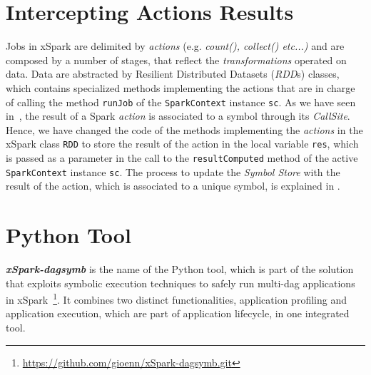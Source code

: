 \section{Intercepting Actions Results}\label{sec:running_jobs}
Jobs in xSpark are delimited by \textit{actions} (e.g. \textit{count(), collect()  etc...)} and are composed by a number of stages, that reflect the \textit{transformations} operated on data. Data are abstracted by Resilient Distributed Datasets (\textit{RDD}s) classes, which contains specialized methods implementing the actions that are in charge of calling the method \texttt{runJob} of  the \texttt{SparkContext} instance \texttt{sc}. 
As we have seen in~, the result of a Spark \textit{action} is associated to a symbol through its \textit{CallSite}. Hence, we have changed the code of the methods implementing the \textit{actions} in the xSpark class \texttt{RDD} to store the result of the action in the local variable \texttt{res}, which is passed as a parameter in the call to the \texttt{resultComputed} method of the active \texttt{SparkContext} instance \texttt{sc}. The process to update the \tool \textit{Symbol Store} with the result of the action, which is associated to a unique symbol, is explained in  .  


\section{Python Tool}\label{sec:xspark_dagsymb}

\textbf{\textit{xSpark-dagsymb}} is the name of the Python tool, which is part of the \tool solution that exploits symbolic execution techniques to safely run multi-dag applications in xSpark~\footnote{\url{https://github.com/gioenn/xSpark-dagsymb.git}}.
It combines two distinct functionalities, application profiling and
application execution, which are part of \tool application lifecycle, in one integrated tool.

